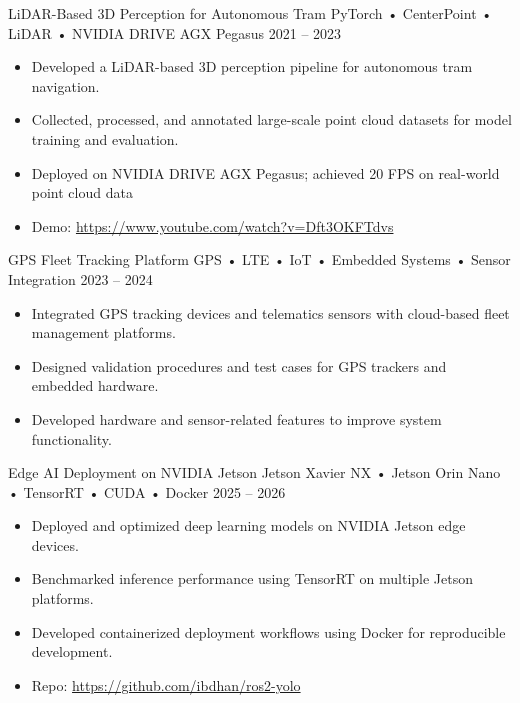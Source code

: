 \begin{sectionbody}

\cvproject
    {LiDAR-Based 3D Perception for Autonomous Tram}
    {PyTorch • CenterPoint • LiDAR • NVIDIA DRIVE AGX Pegasus}
    {2021 -- 2023}
    {
        \begin{itemize}[itemsep=1pt, topsep=2pt]
            \item Developed a LiDAR-based 3D perception pipeline for autonomous tram navigation.
            \item Collected, processed, and annotated large-scale point cloud datasets for model training and evaluation.
            \item Deployed on NVIDIA DRIVE AGX Pegasus; achieved 20 FPS on real-world point cloud data
            \item Demo: \href{https://www.youtube.com/watch?v=Dft3OKFTdvs}{https://www.youtube.com/watch?v=Dft3OKFTdvs}
        \end{itemize}
    }

\cvproject
    {GPS Fleet Tracking Platform}
    {GPS • LTE • IoT • Embedded Systems • Sensor Integration}
    {2023 -- 2024}
    {
        \begin{itemize}[itemsep=1pt, topsep=2pt]
            \item Integrated GPS tracking devices and telematics sensors with cloud-based fleet management platforms.
            \item Designed validation procedures and test cases for GPS trackers and embedded hardware.
            \item Developed hardware and sensor-related features to improve system functionality.
        \end{itemize}
    }

\cvproject
    {Edge AI Deployment on NVIDIA Jetson}
    {Jetson Xavier NX • Jetson Orin Nano • TensorRT • CUDA • Docker}
    {2025 -- 2026}
    {
        \begin{itemize}[itemsep=1pt, topsep=2pt]
            \item Deployed and optimized deep learning models on NVIDIA Jetson edge devices.
            \item Benchmarked inference performance using TensorRT on multiple Jetson platforms.
            \item Developed containerized deployment workflows using Docker for reproducible development.
            \item Repo: \href{https://github.com/ibdhan/ros2-yolo}{https://github.com/ibdhan/ros2-yolo}
        \end{itemize}
    }


\end{sectionbody}
